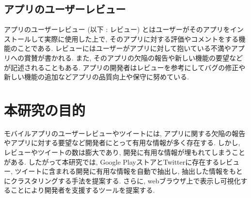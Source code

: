 \subsection{アプリのユーザーレビュー}
アプリのユーザーレビュー (以下 : レビュー) とはユーザーがそのアプリをインストールして実際に使用した上で, そのアプリに対する評価やコメントをする機能のことである. 
レビューにはユーザーがアプリに対して抱いている不満やアプリへの賞賛が書かれる. また, そのアプリの欠陥の報告や新しい機能の要望などが記述されることもある. 
アプリの開発者はレビューを参考にしてバグの修正や新しい機能の追加などアプリの品質向上や保守に努めている. 


\section{本研究の目的}

モバイルアプリのユーザーレビューやツイートには, アプリに関する欠陥の報告やアプリに対する要望など開発者にとって有用な情報が多く存在する. しかし, レビューやツイートの数は膨大であり, 開発に有用な情報が埋もれてしまうことがある. 
したがって本研究では, Google PlayストアとTwitterに存在するレビュー, ツイートに含まれる開発に有用な情報を自動で抽出し, 抽出した情報をもとにクラスタリングする手法を提案する. さらに, webブラウザ上で表示し可視化することにより開発者を支援するツールを提案する. 


